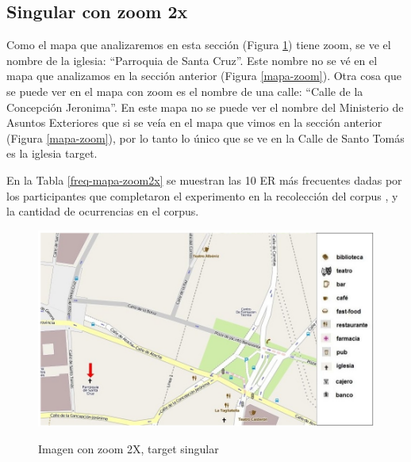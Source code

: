 \subsection{Singular con zoom 2x}
\label{sec:conzoom}
Como el mapa que analizaremos en esta secci\'on (Figura \ref{mapa-zoom2x}) tiene zoom, se ve el nombre de la iglesia:
 ``Parroquia de Santa Cruz''. Este nombre no se v\'e en el mapa que analizamos en la secci\'on anterior (Figura \ref{mapa-zoom}). Otra cosa 
que se puede ver en el mapa con zoom es el nombre de una calle: ``Calle de la Concepci\'on Jeronima''.
En este mapa no se puede ver el nombre del Ministerio de Asuntos Exteriores que si se ve\'ia en el mapa que vimos en la secci\'on anterior (Figura \ref{mapa-zoom}), 
por lo tanto lo \'unico que se ve en la Calle de Santo Tom\'as es la iglesia target. 

En la Tabla \ref{freq-mapa-zoom2x} se muestran las 10 ER m\'as frecuentes dadas por los participantes que completaron el experimento en la recolecci\'on del corpus
, y la cantidad de ocurrencias en el corpus.

\begin{figure}
\centering
\includegraphics[width=120mm]{images/corpus/mapa16.png}\\[0pt]
\caption{Imagen con zoom 2X, target singular}
\label{mapa-zoom2x}
\end{figure}

